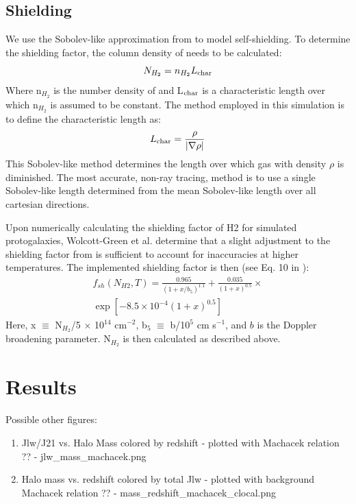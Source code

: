 \documentclass[a4paper,fleqn,usenatbib]{mnras}
\begin{document}
\subsection{\hh{} Shielding}
We use the Sobolev-like approximation from \citet{Wolcott11} to model \hh{} self-shielding. To determine the \hh{} shielding factor, the column density of \hh{} needs to be calculated:
\begin{equation} \label{Nh2}
	N_{H_{2}} = n_{H_{2}}L_{\rm char}
\end{equation}
Where n$_{H_{2}}$ is the number density of \hh{} and L$_{\rm char}$ is a characteristic length over which n$_{H_{2}}$ is assumed to be constant. The method employed in this simulation is to define the characteristic length as:
\begin{equation} \label{Lchar}
	L_{\rm char} = \frac{\rho}{|\nabla \rho|}
\end{equation}
This Sobolev-like method determines the length over which gas with density $\rho$ is diminished. The most accurate, non-ray tracing, method is to use a single Sobolev-like length determined from the mean Sobolev-like length over all cartesian directions. 

Upon numerically calculating the shielding factor of H2 for simulated protogalaxies, Wolcott-Green et al. determine that a slight adjustment to the shielding factor from \citet{Draine96} is sufficient to account for inaccuracies at higher temperatures. The implemented shielding factor is then (see Eq. 10 in \citet{Wolcott11}):
\begin{equation} \label{shield}
	\begin{multlined}
	f_{sh}(N_{H2}, T) = \frac{0.965}{(1+x/b_{5})^{1.1}} + \frac{0.035}{(1+x)^{0.5}}  \times \\ \exp [-8.5 \times 10^{-4} (1+x)^{0.5}]
	\end{multlined}
\end{equation}
Here, x $\equiv$ N$_{H_{2}}$/5 $\times$ 10$^{14}$ cm$^{-2}$, b$_{5}$ $\equiv$ b/10$^{5}$ cm s$^{-1}$, and $b$ is the Doppler broadening parameter. N$_{H_{2}}$ is then calculated as described above.


\section{Results}
Possible other figures:
\begin{enumerate}
\item Jlw/J21 vs. Halo Mass colored by redshift - plotted with Machacek relation ??  - jlw\_mass\_machacek.png
\item Halo mass vs. redshift colored by total Jlw - plotted with background Machacek relation ?? - mass\_redshift\_machacek\_clocal.png
\end{enumerate}
\end{document}
